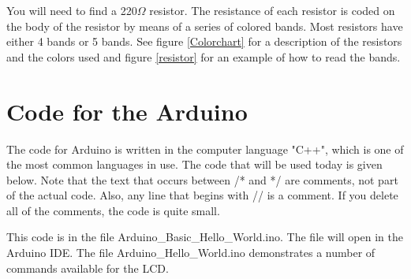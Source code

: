 \documentclass[]{article}
\begin{document}
You will need to find a 220$\Omega$ resistor.  The resistance of each resistor is coded on the body of the resistor by means of a series of colored bands.  Most resistors have either 4 bands or 5 bands.  See figure \ref{Colorchart} for a description of the resistors and the colors used and figure \ref{resistor} for an example of how to read the bands.


\section{Code for the Arduino}

The code for Arduino is written in the computer language "C++", which is one of the most common languages in use.  The code that will be used today is given below.  Note that the text that occurs between 
/* 
and 
*/
are comments, not part of the actual code.  Also, any line that begins with // is a comment. If you delete all of the comments, the code is quite small.

This code is in the file Arduino\_Basic\_Hello\_World.ino.  The file will open in the Arduino IDE.  The file Arduino\_Hello\_World.ino demonstrates a number of commands available for the LCD.  
\bigskip
\end{document}
